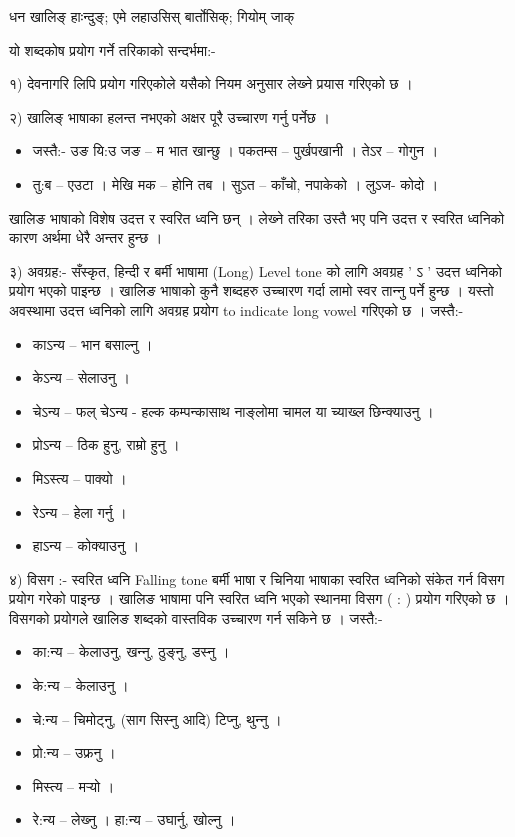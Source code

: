 धन खालिङ् हाःन्दुङ्; एमे लहाउसिस् बार्तोसिक्; गियोम् जाक्





यो शब्दकोष प्रयोग गर्ने तरिकाको सन्दर्भमा:-

१)	देवनागरि लिपि प्रयोग गरिएकोले यसैको नियम अनुसार लेख्‍ने प्रयास गरिएको छ ।

२)	खालिङ् भाषाका हलन्त नभएको अक्षर पूरै उच्‍चारण गर्नु पर्नेछ । 
\begin{itemize}
\item जस्तै:- उङ यि:उ जङ – म भात खान्छु । पकतम्स – पुर्खपखानी । तेऽर – गोगुन ।
\item  तु:ब – एउटा । मेखि मक – होनि तब । सुऽत – काँचो, नपाकेको । लुऽज- कोदो । 
\end{itemize}
खालिङ भाषाको विशेष उदत्त र स्वरित ध्वनि छन् । लेख्‍ने तरिका उस्तै भए पनि उदत्त र स्वरित ध्वनिको कारण अर्थमा धेरै अन्तर हुन्छ ।

३) अवग्रह:- सँस्कृत, हिन्दी र बर्मी भाषामा (Long) Level tone को लागि अवग्रह  ' ऽ ' उदत्त ध्वनिको प्रयोग भएको पाइन्छ । खालिङ भाषाको कुनै शब्दहरु उच्‍चारण गर्दा लामो स्वर तान्‍नु पर्ने हुन्छ । यस्तो अवस्थामा उदत्त ध्वनिको लागि अवग्रह प्रयोग to indicate long vowel गरिएको छ । जस्तै:-
\begin{itemize}
\item काऽन्य – भान बसाल्‍नु ।
\item केऽन्य – सेलाउनु ।
\item चेऽन्य – फल् चेऽन्य - हल्क कम्पन्कासाथ नाङ्लोमा चामल या च्याख्ल छिन्क्याउनु ।
\item प्रोऽन्य – ठिक हुनु, राम्रो हुनु ।
\item मिऽस्त्य – पाक्यो । 
\item रेऽन्य – हेला गर्नु ।
\item हाऽन्य – कोक्याउनु ।
\end{itemize}

४) विस\reph{}ग :-	 स्वरित ध्वनि Falling tone
बर्मी भाषा र चिनिया भाषाका स्वरित ध्वनिको संकेत गर्न विस\reph{}ग प्रयोग गरेको पाइन्छ । खालिङ भाषामा पनि स्वरित ध्वनि भएको स्थानमा विस\reph{}ग ( : ) प्रयोग गरिएको छ । विस\reph{}गको प्रयोगले खालिङ शब्दको वास्तविक उच्‍चारण गर्न सकिने छ । 
जस्तै:-
\begin{itemize}
\item  का:न्य – केलाउनु, खन्‍नु, ठुङ्‍नु, डस्‍नु ।
\item  के:न्य – केलाउनु ।
\item  चे:न्य – चिमोट्‍नु, (साग सिस्‍नु आदि) टिप्‍नु, थुन्‍नु ।
\item  प्रो:न्य – उफ्रनु । 
\item  मिस्त्य –  मर्‍यो ।
\item  रे:न्य – लेख्‍नु । 
हा:न्य – उघार्नु, खोल्‍नु ।
\end{itemize}

